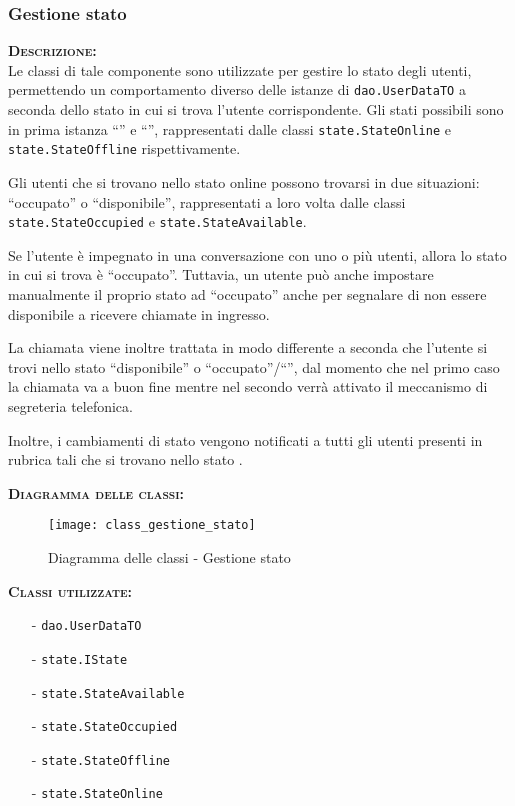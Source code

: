 \subsubsection{Gestione stato}
\begin{description}
	\item{\scshape\bfseries Descrizione:}\\
Le classi di tale componente sono utilizzate per gestire lo stato degli utenti, permettendo un comportamento diverso delle istanze di \texttt{dao.UserDataTO} a seconda dello stato in cui si trova l'utente corrispondente. Gli stati possibili sono in prima istanza ``'' e ``'', rappresentati dalle classi \texttt{state.StateOnline} e \texttt{state.StateOffline} rispettivamente.

Gli utenti che si trovano nello stato online possono trovarsi in due situazioni: ``occupato'' o ``disponibile'', rappresentati a loro volta dalle classi \texttt{state.StateOccupied} e \texttt{state.StateAvailable}.

Se l'utente è impegnato in una conversazione con uno o più utenti, allora lo stato in cui si trova è ``occupato''. Tuttavia, un utente può anche impostare manualmente il proprio stato ad ``occupato'' anche per segnalare di non essere disponibile a ricevere chiamate in ingresso.
	
La chiamata viene inoltre trattata in modo differente a seconda che l'utente si trovi nello stato ``disponibile'' o ``occupato''/``'', dal momento che nel primo caso la chiamata va a buon fine mentre nel secondo verrà attivato il meccanismo di segreteria telefonica.
	
Inoltre, i cambiamenti di stato vengono notificati a tutti gli utenti presenti in rubrica tali che si trovano nello stato .
	\item{\scshape\bfseries Diagramma delle classi:}
	\begin{figure}[H]
\begin{center}
\texttt{[image: class\_gestione\_stato]}
\caption{Diagramma delle classi - Gestione stato}\label{fig:gestione_stato}
\end{center}
\end{figure}
	
	\item{\scshape\bfseries Classi utilizzate:}\\ 
	\begin{itemize}[noitemsep,nolistsep]
		\item[-] \texttt{dao.UserDataTO}
	    \item[-] \texttt{state.IState}
	    \item[-] \texttt{state.StateAvailable}
	    \item[-] \texttt{state.StateOccupied}
	    \item[-] \texttt{state.StateOffline}
	    \item[-] \texttt{state.StateOnline}
	\end{itemize}
\end{description}

